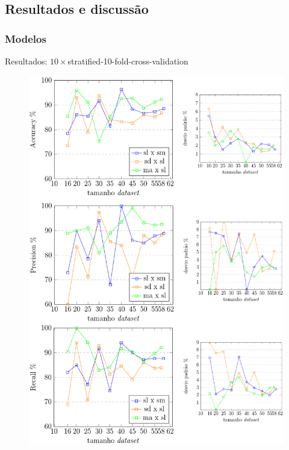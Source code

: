 \documentclass[brazil]{beamer}
\begin{document}
\subsection{Resultados e discussão}
\subsubsection{Modelos}
\begin{frame}{Resultados: $10\times$stratified-10-fold-cross-validation}
\begin{figure}[!htb] \centering 
  \centering
  \includegraphics[width=0.5\columnwidth]{slide/accuracy_precision_recall} 
  \caption{} 
  \label{fig:accuracy_precision_recall}
\end{figure}
\end{frame}
\end{document}
